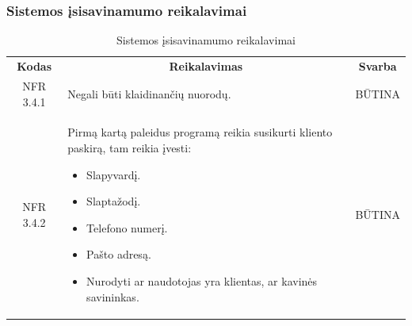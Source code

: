 \documentclass{VUMIFPSkursinis}
\begin{document}
\subsubsection{Sistemos įsisavinamumo reikalavimai}
\begin{center}
	\begin{table}[H]
	\caption{Sistemos įsisavinamumo reikalavimai}
	\begin{tabular}{|p{2cm}|p{}|p{}|}
	\hline
	    \rowcolor{lightgray}
		\multicolumn{3}{|c|}{Sistemos įsisavinamumo reikalavimai}\\
		
	\hline
		\multicolumn{1}{|c|}{{\bfseries Kodas}}&
		\multicolumn{1}{|c|}{{\bfseries Reikalavimas}}&
		\multicolumn{1}{|c|}{{\bfseries Svarba}}\\
	\hline 	
		\multicolumn{1}{|c|}{NFR 3.4.1}&
		{Negali būti klaidinančių nuorodų.}&
		\multicolumn{1}{|c|}{BŪTINA}\\	
	
	\hline 	
		\multicolumn{1}{|c|}{NFR 3.4.2}&
		{Pirmą kartą paleidus programą reikia susikurti kliento paskirą, tam reikia įvesti:
			\begin{itemize}
				\item Slapyvardį.
				\item Slaptažodį.
				\item Telefono numerį.
				\item Pašto adresą.
				\item Nurodyti ar naudotojas yra klientas, ar kavinės savininkas.
			\end{itemize}}&
		\multicolumn{1}{|c|}{BŪTINA}\\	
	
	\hline 	
	
	\end{tabular}
	
	\label{table:Sistemosįsisavinamumoreikalavimai}
	\end{table}

\end{center}
\end{document}
